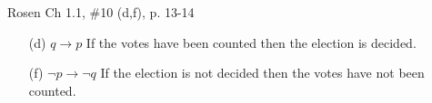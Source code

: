 \documentclass[12pt,addpoints]{exam}
\newcommand{\ra}{\rightarrow}
\newcommand{\lra}{\leftrightarrow}
\begin{document}
\begin{questions}
\question Rosen Ch 1.1, \#10 (d,f), p. 13-14
    \ifprintanswers
        \vspace{-15pt}
    \fi
    \begin{solution}
        \begin{itemize}[itemsep=0pt,parsep=0pt,topsep=0pt,partopsep=0pt]
        \item[(d)] $q \ra p$
        If the votes have been counted then the election is decided.
        \item[(f)] $\neg p \ra \neg q$
        If the election is not decided then the votes have not been counted.
        \end{itemize}
    \end{solution}


\end{questions}
\end{document}
